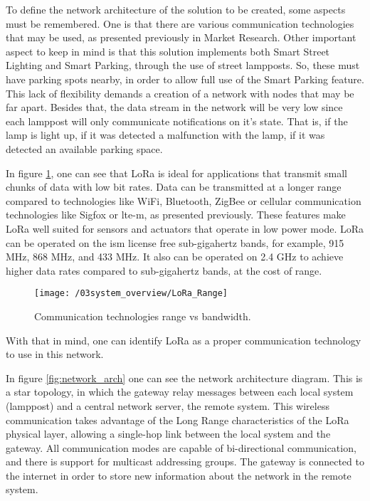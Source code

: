 To define the network architecture of the solution to be created, some aspects must be remembered. One is that there are various communication technologies that may be used, as presented previously in Market Research. Other important aspect to keep in mind is that this solution implements both Smart Street Lighting and Smart Parking, through the use of street lampposts. So, these must have parking spots nearby, in order to allow full use of the Smart Parking feature. This lack of flexibility demands a creation of a network with nodes that may be far apart. Besides that, the data stream in the network will be very low since each lamppost will only communicate notifications on it's state. That is, if the lamp is light up, if it was detected a malfunction with the lamp, if it was detected an available parking space. 

In figure \ref{fig:LoRa_Range}, one can see that LoRa is ideal for applications that transmit small chunks of data with low bit rates. Data can be transmitted at a longer range compared to technologies like WiFi, Bluetooth, ZigBee or cellular communication technologies like Sigfox or \ac{lte-m}, as presented previously. These features make LoRa well suited for sensors and actuators that operate in low power mode. LoRa can be operated on the \ac{ism} license free sub-gigahertz bands, for example, 915 MHz, 868 MHz, and 433 MHz. It also can be operated on 2.4 GHz to achieve higher data rates compared to sub-gigahertz bands, at the cost of range. \cite{lora_lorawan}

\clearpage
\begin{figure}[ht]
	\centering
	\texttt{[image: /03system\_overview/LoRa\_Range]}
	\caption{Communication technologies range vs bandwidth.}
	\label{fig:LoRa_Range}
\end{figure}

With that in mind, one can identify LoRa as a proper communication technology to use in this network. 

In figure \ref{fig:network_arch} one can see the network architecture diagram. This is a star topology, in which the gateway relay messages between each local system (lamppost) and a central network server, the remote system. This wireless communication takes advantage of the Long Range characteristics of the LoRa physical layer, allowing a single-hop link between the local system and the gateway. All communication modes are capable of bi-directional communication, and there is support for multicast addressing groups. The gateway is connected to the internet in order to store new information about the network in the remote system.

